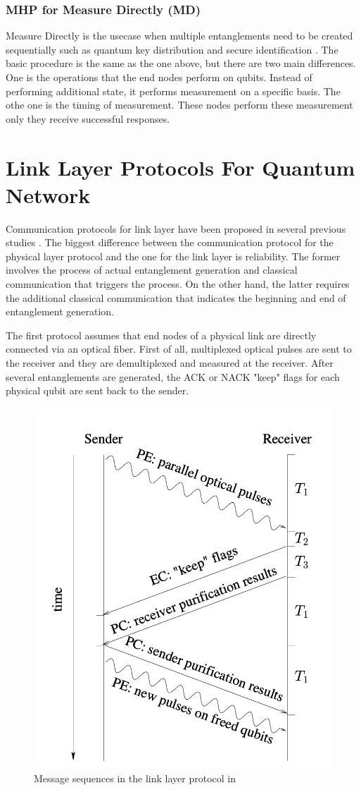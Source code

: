 \subsubsection{MHP for Measure Directly (MD)}

Measure Directly is the usecase when multiple entanglements need to be created sequentially such as quantum key distribution \cite{PhysRevLett.67.661} and secure identification \cite{damgaard2007secure}.
The basic procedure is the same as the one above, but there are two main differences.  One is the operations that the end nodes perform on qubits.
Instead of performing additional state, it performs measurement on a specific basis.  The othe one is the timing of measurement. These nodes perform these measurement only they receive successful responses.

\section{Link Layer Protocols For Quantum Network}

Communication protocols for link layer have been proposed in several previous studies \cite{Van_Meter_2009,Dahlberg_2019,matsuo2019simulation}.
The biggest difference between the communication protocol for the physical layer protocol and the one for the link layer is reliability.
The former involves the process of actual entanglement generation and classical communication that triggers the process. On the other hand, the latter requires the additional classical communication that indicates the beginning and end of entanglement generation.

The first protocol \cite{Van_Meter_2009} assumes that end nodes of a physical link are directly connected via an optical fiber. First of all, multiplexed optical pulses are sent to the receiver and they are demultiplexed and measured at the receiver.
After several entanglements are generated, the ACK or NACK "keep" flags for each physical qubit are sent back to the sender.
\begin{figure}[H]
  \centerline{\includegraphics[width=.5\columnwidth]{images/link_protocol_rdv.jpg}}
  \caption{Message sequences in the link layer protocol in  \cite{Van_Meter_2009}}
\end{figure}

